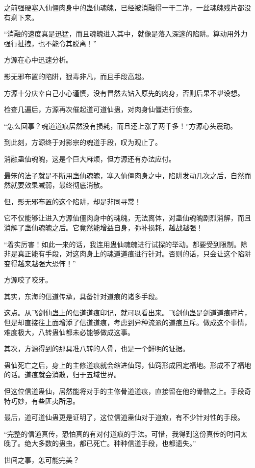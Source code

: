 \begin{this_body}
之前强硬塞入仙僵肉身中的蛊仙魂魄，已经被消融得一干二净，一丝魂魄残片都没有剩下来。

“消融的速度真是迅猛，而且魂魄进入其中，就像是落入深邃的陷阱。算动用外力强行扯拽，也不能令其脱离！”

方源在心中迅速分析。

影无邪布置的陷阱，狠毒非凡，而且手段高超。

方源十分庆幸自己小心谨慎，没有冒然去钻入原先的肉身，否则后果不堪设想。

检查几遍后，方源再次催起道可道仙蛊，对肉身仙僵进行侦查。

“怎么回事？魂道道痕居然没有损耗，而且还上涨了两千多！”方源心头震动。

到此刻，方源终于对影宗的魂道手段，叹为观止了。

消融蛊仙魂魄，这是个巨大麻烦，但方源还有办法应付。

最笨的法子就是不断用蛊仙魂魄，塞入仙僵肉身之中，陷阱发动几次之后，自然而然就要效果减弱，最终彻底消散。

但，影无邪布置的这个陷阱，却是非同寻常！

它不仅能够让进入方源仙僵肉身中的魂魄，无法离体，对蛊仙魂魄剧烈消解，而且消解了蛊仙魂魄之后。它竟然能增益自身，弥补损耗，越战越强！

“着实厉害！如此一来的话，我连用蛊仙魂魄进行试探的举动。都要受到限制。除非是真正能有手段，对这肉身上的魂道道痕进行针对。否则的话，只会让这个陷阱变得越来越强大恐怖！”

方源咬了咬牙。

其实，东海的信道传承，具备针对道痕的诸多手段。

这点。从飞剑仙蛊上的信道道痕印记，就可以看出来。飞剑仙蛊是剑道道痕碎片，但是却直接往上面增添了信道道痕，考虑到异种流派的道痕互斥。做成这个事情，难度极大，八转蛊仙都未必能够做成这事。

其次，方源得到的那具准八转的人骨，也是一个鲜明的证据。

蛊仙死亡之后，身上的主修道痕就会缩进仙窍，仙窍形成固定福地。形成不了福地的话。道痕就会消散，归于五域世界。

但这位信道蛊仙，居然能将对手的主修骨道道痕，直接留在他的骨骼之上。手段奇特巧妙，有些匪夷所思。

最后，道可道仙蛊更是证明了，这位信道蛊仙对于道痕，有不少针对性的手段。

“完整的信道真传，恐怕真的有对付道痕的手法。可惜，我得到这份真传的时间太晚了。绝大多数的蛊虫，都已死亡。种种信道手段，也都遗失。”

世间之事，怎可能完美？


\end{this_body}
